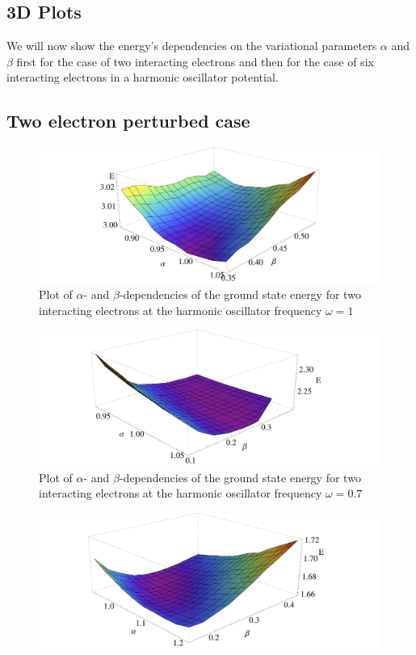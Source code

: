 \begin{appendix}
\section{3D Plots}
We will now show the energy's dependencies on the variational parameters $\alpha$ and $\beta$ first for the case of two interacting electrons and then for the case of six interacting electrons in a harmonic oscillator potential.
\subsection{Two electron perturbed case}
\begin{figure}
    \centering
    \includegraphics[scale=0.36]{ptwo1}
    \caption{Plot of $\alpha$- and $\beta$-dependencies of the ground state energy for two interacting electrons at the harmonic oscillator frequency $\omega=1$}
    \label{fig:ptwo1}
\end{figure}
\begin{figure}
    \centering
    \includegraphics[scale=0.36]{ptwo07}
    \caption{Plot of $\alpha$- and $\beta$-dependencies of the ground state energy for two interacting electrons at the harmonic oscillator frequency $\omega=0.7$}
    \label{fig:ptwo07}
\end{figure}
\begin{figure}
    \centering
    \includegraphics[scale=0.36]{ptwo05}

\end{figure}
\end{appendix}
